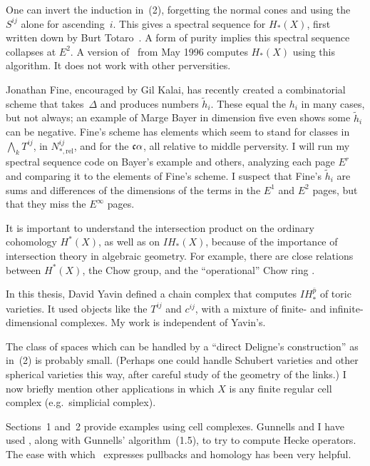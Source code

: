 One can invert the induction in~(2), forgetting the normal cones and
using the $S^{ij}$ alone for ascending~$i$.  This gives a spectral
sequence for $H_*(X)$, first written down by Burt Totaro~\cite{T}.  A
form of purity implies this spectral sequence collapses at $E^2$.  A
version of \shh\ from May 1996 computes $H_*(X)$ using this algorithm.
It does not work with other perversities.

Jonathan Fine, encouraged by Gil Kalai, has recently created a
combinatorial scheme that takes~$\Delta$ and produces numbers $\tilde
h_i$.  These equal the $h_i$ in many cases, but not always; an example
of Marge Bayer in dimension five even shows some $\tilde h_i$ can be
negative.  Fine's scheme has elements which seem to stand for classes
in $\bigwedge\nolimits_k T^{ij}$, in $N^{ij}_{*,\text{rel}}$, and for
the $\frak c \alpha$, all relative to middle perversity.  I will run
my spectral sequence code on Bayer's example and others, analyzing
each page $E^r$ and comparing it to the elements of Fine's scheme.  I
suspect that Fine's $\tilde h_i$ are sums and differences of the
dimensions of the terms in the $E^1$ and $E^2$ pages, but that they
miss the $E^\infty$ pages.

It is important to understand the intersection product on the ordinary
cohomology $H^*(X)$, as well as on $IH_*(X)$, because of the
importance of intersection theory in algebraic geometry.  For example,
there are close relations between $H^*(X)$, the Chow group, and the
``operational'' Chow ring \cite{F-M-S-S} \cite{T}.

In this thesis, David Yavin defined a chain complex that computes
$IH^{\bar p}_*$ of toric varieties.  It used objects like the $T^{ij}$
and $c^{ij}$, with a mixture of finite- and infinite-dimensional
complexes.  My work is independent of Yavin's.

 The class of spaces which can
be handled by a ``direct Deligne's construction'' as in~(2) is
probably small.  (Perhaps one could handle Schubert varieties and
other spherical varieties this way, after careful study of the
geometry of the links.)  I now briefly mention other applications in
which $X$ is any finite regular cell complex (e.g.~simplicial
complex).

\comment
Sections~1 and~2 provide examples using cell complexes.  Gunnells and
I have used \shh, along with Gunnells' algorithm~(1.5), to try to
compute Hecke operators.  The ease with which \shh\ expresses
pullbacks and homology has been very helpful.
\endcomment

